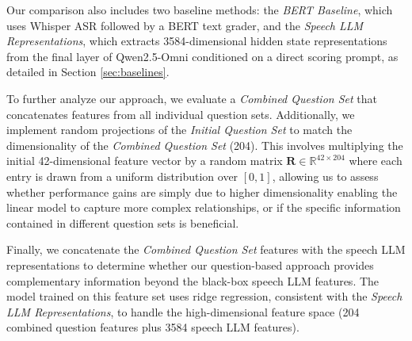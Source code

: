 \documentclass{report}
\begin{document}
Our comparison also includes two baseline methods: the \emph{BERT Baseline}, which uses Whisper ASR followed by a BERT text grader, and the \emph{Speech LLM Representations}, which extracts 3584-dimensional hidden state representations from the final layer of Qwen2.5-Omni conditioned on a direct scoring prompt, as detailed in Section \ref{sec:baselines}.

To further analyze our approach, we evaluate a \emph{Combined Question Set} that concatenates features from all individual question sets. Additionally, we implement random projections of the \emph{Initial Question Set} to match the dimensionality of the \emph{Combined Question Set} (204). This involves multiplying the initial 42-dimensional feature vector by a random matrix $\mathbf{R} \in \mathbb{R}^{42 \times 204}$ where each entry is drawn from a uniform distribution over $[0, 1]$, allowing us to assess whether performance gains are simply due to higher dimensionality enabling the linear model to capture more complex relationships, or if the specific information contained in different question sets is beneficial.

Finally, we concatenate the \emph{Combined Question Set} features with the speech LLM representations to determine whether our question-based approach provides complementary information beyond the black-box speech LLM features. The model trained on this feature set uses ridge regression, consistent with the \emph{Speech LLM Representations}, to handle the high-dimensional feature space (204 combined question features plus 3584 speech LLM features).
\end{document}
